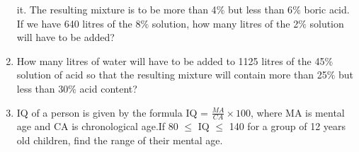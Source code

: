 \begin{enumerate}[label=\arabic*.,ref=\thesubsection.\theenumi]
it. The resulting mixture is to be more than 4$\%$ but less than 6$\%$ boric acid. If we have
640 litres of the 8$\%$ solution, how many litres of the 2$\%$ solution will have to be added?
    \item How many litres of water will have to be added to 1125 litres of the 45$\%$ solution
of acid so that the resulting mixture will contain more than 25$\%$ but less than 30$\%$ acid
content?
    \item IQ of a person is given by the formula
            IQ = $\frac{MA}{CA}\times 100$,
    where MA is mental age and CA is chronological age.If 80 $\leq$ IQ $\leq$ 140 for a group of
12 years old children, find the range of their mental age.
%
\end{enumerate}
